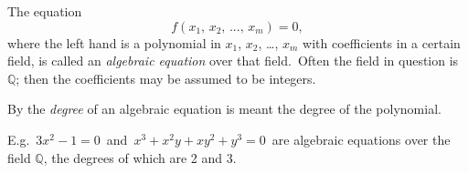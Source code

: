 \documentclass[12pt]{article}
\theoremstyle{definition}
\begin{document}
The equation 
$$f(x_1,\,x_2,\,...,\,x_m) = 0,$$
where the left hand  is a polynomial in $x_1$, $x_2$, \ldots, $x_m$ with coefficients in a certain field, is called an {\em algebraic equation} over that field.\, Often the field in question is $\mathbb{Q}$; then the coefficients may be assumed to be integers.

By the {\em degree} of an algebraic equation is meant the degree of the polynomial.

E.g.\, $3x^2-1 = 0$\, and\, $x^3+x^2y+xy^2+y^3 = 0$\, are algebraic equations over the field $\mathbb{Q}$, the degrees of which are 2 and 3.
\end{document}
